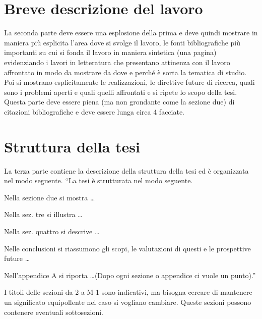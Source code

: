 \section{Breve descrizione del lavoro}
La seconda parte deve essere una esplosione della prima e deve quindi mostrare in maniera pi\`u esplicita l'area dove si svolge il lavoro, le fonti bibliografiche pi\`u importanti su cui si fonda il lavoro in maniera sintetica (una pagina) evidenziando i lavori in letteratura che presentano attinenza con il lavoro affrontato in modo da mostrare da dove e perch\'e \`e sorta la tematica di studio. Poi si mostrano esplicitamente le realizzazioni, le direttive future di ricerca, quali sono i problemi aperti e quali quelli affrontati e si ripete lo scopo della tesi. Questa parte deve essere piena (ma non grondante come la sezione due) di citazioni bibliografiche e deve essere lunga circa 4 facciate.

\section{Struttura della tesi}
La terza parte contiene la descrizione della struttura della tesi ed \`e organizzata nel modo seguente.
``La tesi \`e strutturata nel modo seguente.

Nella sezione due si mostra \dots

Nella sez. tre si illustra \dots

Nella sez. quattro si descrive \dots

Nelle conclusioni si riassumono gli scopi, le valutazioni di questi e le prospettive future \dots

Nell'appendice A si riporta \dots (Dopo ogni sezione o appendice ci vuole un punto).''

I titoli delle sezioni da 2 a M-1 sono indicativi, ma bisogna cercare di mantenere un significato equipollente nel caso si vogliano cambiare. Queste sezioni possono contenere eventuali sottosezioni.
